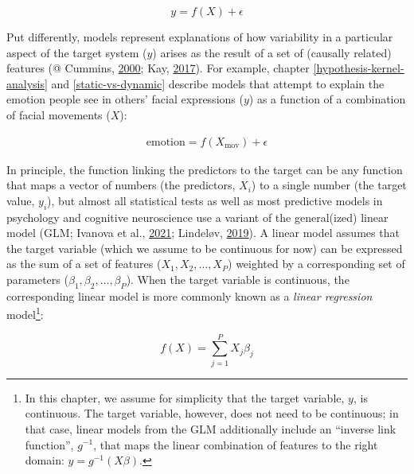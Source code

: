 \documentclass[11pt,american,a4paper,oneside,]{memoir} %
\let\rmarkdownfootnote\footnote%
\def\footnote{\protect\rmarkdownfootnote}
\begin{document}
\begin{equation}
y = f(X) + \epsilon
\end{equation}

Put differently, models represent explanations of how variability in a particular aspect of the target system (\(y\)) arises as the result of a set of (causally related) features (@ Cummins, \protect\hyperlink{ref-Cummins2000-pk}{2000}; Kay, \protect\hyperlink{ref-Kay2017-vr}{2017}). For example, chapter \ref{hypothesis-kernel-analysis} and \ref{static-vs-dynamic} describe models that attempt to explain the emotion people see in others' facial expressions (\(y\)) as a function of a combination of facial movements (\(X\)):

\begin{align}
\mathrm{emotion} = f(X_{\mathrm{mov}}) + \epsilon
\end{align}

In principle, the function linking the predictors to the target can be any function that maps a vector of numbers (the predictors, \(X_{i}\)) to a single number (the target value, \(y_{i}\)), but almost all statistical tests as well as most predictive models in psychology and cognitive neuroscience use a variant of the general(ized) linear model (GLM; Ivanova et al., \protect\hyperlink{ref-Ivanova2021-wk}{2021}; Lindeløv, \protect\hyperlink{ref-Lindelov2019-jk}{2019}). A linear model assumes that the target variable (which we assume to be continuous for now) can be expressed as the sum of a set of features (\(X_{1}, X_{2}, \dots , X_{P}\)) weighted by a corresponding set of parameters (\(\beta_{1}, \beta_{2}, \dots , \beta_{P}\)). When the target variable is continuous, the corresponding linear model is more commonly known as a \emph{linear regression} model\footnote{In this chapter, we assume for simplicity that the target variable, \(y\), is continuous. The target variable, however, does not need to be continuous; in that case, linear models from the GLM additionally include an ``inverse link function'', \(g^{-1}\), that maps the linear combination of features to the right domain: \(y = g^{-1}(X\beta)\).}:

\begin{equation}
f(X) = \sum_{j=1}^{P}X_{j} \beta_{j}
\end{equation}
\end{document}
